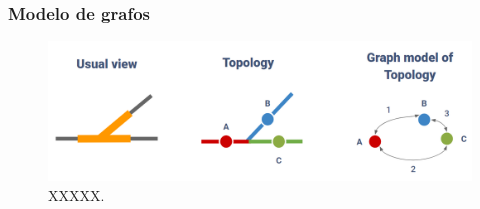 \subsubsection{Modelo de grafos}

    \lipsum[1]

    \begin{figure}[!h]
        \centering
        \includegraphics[width=1\textwidth]{Figuras/grafos}
        \centering\caption{XXXXX.}
        \label{fig:grafos_1}
    \end{figure}

    \lipsum[1]